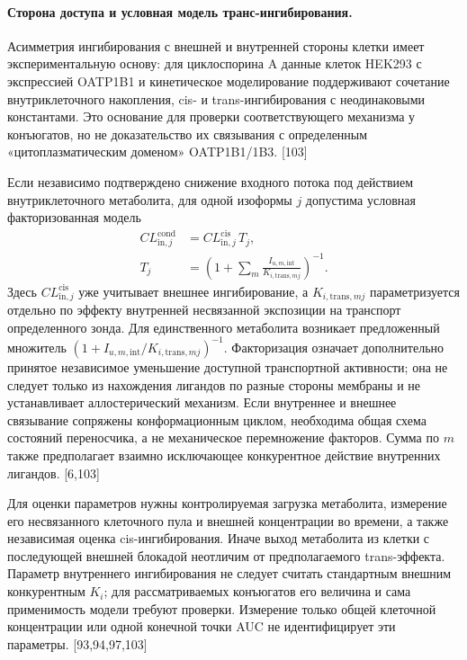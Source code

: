 \documentclass[11pt]{article}
\begin{document}
\paragraph{Сторона доступа и условная модель транс-ингибирования.}
Асимметрия ингибирования с внешней и внутренней стороны клетки имеет экспериментальную основу: для циклоспорина A данные клеток HEK293 с экспрессией OATP1B1 и кинетическое моделирование поддерживают сочетание внутриклеточного накопления, cis- и trans-ингибирования с неодинаковыми константами. Это основание для проверки соответствующего механизма у конъюгатов, но не доказательство их связывания с определенным «цитоплазматическим доменом» OATP1B1/1B3. [103]

Если независимо подтверждено снижение входного потока под действием внутриклеточного метаболита, для одной изоформы \(j\) допустима условная факторизованная модель
\[
\begin{aligned}
CL_{\mathrm{in},j}^{\mathrm{cond}}
&=CL_{\mathrm{in},j}^{\mathrm{cis}}\,T_j,\\
T_j&=\left(1+\sum_m
\frac{I_{u,m,\mathrm{int}}}{K_{i,\mathrm{trans},mj}}
\right)^{-1}.
\end{aligned}
\]
Здесь \(CL_{\mathrm{in},j}^{\mathrm{cis}}\) уже учитывает внешнее ингибирование, а \(K_{i,\mathrm{trans},mj}\) параметризуется отдельно по эффекту внутренней несвязанной экспозиции на транспорт определенного зонда. Для единственного метаболита возникает предложенный множитель \((1+I_{u,m,\mathrm{int}}/K_{i,\mathrm{trans},mj})^{-1}\). Факторизация означает дополнительно принятое независимое уменьшение доступной транспортной активности; она не следует только из нахождения лигандов по разные стороны мембраны и не устанавливает аллостерический механизм. Если внутреннее и внешнее связывание сопряжены конформационным циклом, необходима общая схема состояний переносчика, а не механическое перемножение факторов. Сумма по \(m\) также предполагает взаимно исключающее конкурентное действие внутренних лигандов. [6,103]

Для оценки параметров нужны контролируемая загрузка метаболита, измерение его несвязанного клеточного пула и внешней концентрации во времени, а также независимая оценка cis-ингибирования. Иначе выход метаболита из клетки с последующей внешней блокадой неотличим от предполагаемого trans-эффекта. Параметр внутреннего ингибирования не следует считать стандартным внешним конкурентным \(K_i\); для рассматриваемых конъюгатов его величина и сама применимость модели требуют проверки. Измерение только общей клеточной концентрации или одной конечной точки AUC не идентифицирует эти параметры. [93,94,97,103]
\end{document}
